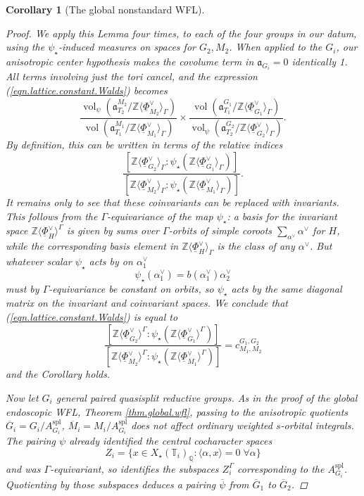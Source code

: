 \documentclass[openany]{amsbook}
\newtheorem{corollary}[theorem]{Corollary}
\theoremstyle{definition}
\theoremstyle{remark}
\numberwithin{equation}{section}
\newcommand{\Q}{\mathbb{Q}}
\newcommand{\Z}{\mathbb{Z}}
\newcommand{\T}{\mathbb{T}}
\newcommand{\ol}[1]{\overline{#1}}
\newcommand{\ul}[1]{\underline{#1}}
\newcommand{\vol}{\operatorname{vol}}
\renewcommand{\-}{\operatorname{-}}
\renewcommand{\a}{\mathfrak{a}}
\newcommand{\spl}{\mathrm{spl}}
\begin{document}
\begin{corollary}[The global nonstandard WFL]
\begin{proof}
        
        We apply this Lemma four times, to each of the four groups in our datum, using the $\psi_\star$-induced measures on spaces for $G_2, M_2$. When applied to the $G_i$, our anisotropic center hypothesis makes the covolume term in $\a_{G_i} = 0$ identically 1. All terms involving just the tori cancel, and the expression (\ref{eqn.lattice.constant.Walds}) becomes
        $$
            \frac{\vol_{\psi}(\a_{T_2}^{M_2}/ \Z\langle \ul{\Phi}_{M_2}^\vee \rangle_\Gamma)}{\vol(\a_{T_1}^{M_1}/ \Z\langle \ul{\Phi}_{M_1}^\vee \rangle_\Gamma)} \times \frac{\vol(\a_{T_1}^{G_1}/ \Z\langle \ul{\Phi}_{G_1}^\vee \rangle_\Gamma)}{\vol_{\psi}(\a_{T_2}^{G_2}/ \Z\langle \ul{\Phi}_{G_2}^\vee \rangle_\Gamma)}.
        $$
        By definition, this can be written in terms of the relative indices
        $$
            \frac{[\Z \langle \ul{\Phi}_{G_2}^\vee \rangle_{\Gamma} : \psi_\star(\Z\langle \ul{\Phi}_{G_1}^\vee \rangle_{\Gamma})]}{[\Z \langle \ul{\Phi}_{M_2}^\vee \rangle_{\Gamma} : \psi_\star(\Z\langle \ul{\Phi}_{M_1}^\vee \rangle_{\Gamma})]}.
        $$
        It remains only to see that these coinvariants can be replaced with invariants. This follows from the $\Gamma$-equivariance of the map $\psi_\star$: a basis for the invariant space $\Z \langle \ul{\Phi}_{H}^\vee \rangle^{\Gamma}$ is given by sums over $\Gamma$-orbits of simple coroots $\sum_{\alpha^{\vee}} \alpha^\vee$ for $H$, while the corresponding basis element in $\Z \langle \ul{\Phi}_{H}^\vee \rangle_{\Gamma}$ is the class of any $\alpha^\vee$. But whatever scalar $\psi_\star$ acts by on $\alpha^\vee_1$
        $$
            \psi_\star(\alpha_1^\vee) = b(\alpha_1^\vee) \alpha_2^\vee
        $$
        must by $\Gamma$-equivariance be constant on orbits, so $\psi_\star$ acts by the same diagonal matrix on the invariant and coinvariant spaces. We conclude that (\ref{eqn.lattice.constant.Walds}) is equal to    
        $$
            \frac{[\Z \langle \ul{\Phi}_{G_2}^\vee \rangle^{\Gamma} : \psi_\star(\Z\langle \ul{\Phi}_{G_1}^\vee \rangle^{\Gamma})]}{[\Z \langle \ul{\Phi}_{M_2}^\vee \rangle^{\Gamma} : \psi_\star(\Z\langle \ul{\Phi}_{M_1}^\vee \rangle^{\Gamma})]} = c_{M_1, M_2}^{G_1, G_2}
        $$
        and the Corollary holds.

        Now let $G_i$ general paired quasisplit reductive groups. As in the proof of the global endoscopic WFL, Theorem \ref{thm.global.wfl}, passing to the anisotropic quotients $\ol{G}_i = G_i/A_{G_i}^{\spl}$, $\ol{M}_i = M_i/A_{G_i}^{\spl}$ does not affect ordinary weighted $s$-orbital integrals. The pairing $\psi$ already identified the central cocharacter spaces
        $$
            Z_i = \{x \in X_\star(\T_i)_{\Q} : \langle \alpha, x \rangle = 0 \;\forall \alpha\}
        $$
        and was $\Gamma$-equivariant, so identifies the subspaces $Z_i^\Gamma$ corresponding to the $A_{G_i}^{\spl}$. Quotienting by those subspaces deduces a pairing $\ol{\psi}$ from $\ol{G}_1$ to $\ol{G}_2$. 
         

\end{proof}
\end{corollary}
\end{document}
